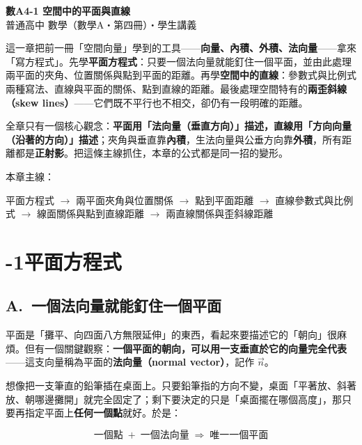 \documentclass[11pt]{article}
\begin{document}
\begin{center}
{\sffamily\Huge\bfseries 數A4-1 空間中的平面與直線}\\[3pt]
{\sffamily\large 普通高中 數學（數學A・第四冊）・學生講義}
\end{center}
\vspace{0.6em}

這一章把前一冊「空間向量」學到的工具——\textbf{向量、內積、外積、法向量}——拿來「寫方程式」。先學\textbf{平面方程式}：只要一個法向量就能釘住一個平面，並由此處理兩平面的夾角、位置關係與點到平面的距離。再學\textbf{空間中的直線}：參數式與比例式兩種寫法、直線與平面的關係、點到直線的距離。最後處理空間特有的\textbf{兩歪斜線（skew lines）}——它們既不平行也不相交，卻仍有一段明確的距離。

\medskip
全章只有一個核心觀念：\textbf{平面用「法向量（垂直方向）」描述，直線用「方向向量（沿著的方向）」描述}；夾角與垂直靠\textbf{內積}，生法向量與公垂方向靠\textbf{外積}，所有距離都是\textbf{正射影}。把這條主線抓住，本章的公式都是同一招的變形。

\medskip
本章主線：

\begin{center}
平面方程式 $\rightarrow$ 兩平面夾角與位置關係 $\rightarrow$ 點到平面距離 $\rightarrow$ 直線參數式與比例式 $\rightarrow$ 線面關係與點到直線距離 $\rightarrow$ 兩直線關係與歪斜線距離
\end{center}

\section*{-1\quad 平面方程式}

\subsection*{\sffamily A.\ 一個法向量就能釘住一個平面}

平面是「攤平、向四面八方無限延伸」的東西，看起來要描述它的「朝向」很麻煩。但有一個關鍵觀察：\textbf{一個平面的朝向，可以用一支垂直於它的向量完全代表}——這支向量稱為平面的\textbf{法向量（normal vector）}，記作 $\vec n$。

想像把一支筆直的鉛筆插在桌面上。只要鉛筆指的方向不變，桌面「平著放、斜著放、朝哪邊攤開」就完全固定了；剩下要決定的只是「桌面擺在哪個高度」，那只要再指定平面上\textbf{任何一個點}就好。於是：

$$\boxed{\;\text{一個點} \;+\; \text{一個法向量} \;\Longrightarrow\; \text{唯一一個平面}\;}$$

\end{document}
